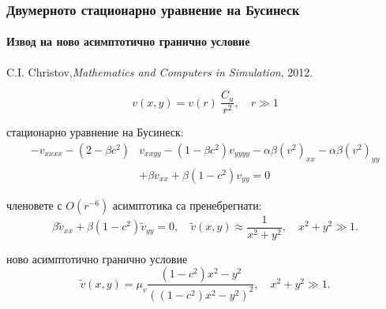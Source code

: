\documentclass{beamer}
\begin{document}

\begin{frame}
\frametitle{Двумерното стационарно уравнение на Бусинеск}
\framesubtitle{Извод на ново асимптотично гранично условие}

\begin{itemize}
 {\footnotesize \item  C.I. Christov,{\it Mathematics and Computers in Simulation}, 2012.}
\begin{equation}
v(x,y) = v(r) ~ \frac{C_u}{r^2}, \quad r\gg1
\end{equation}
\item стационарно уравнение на Бусинеск:
\begin{align}\label{outliers}
- v_{xxxx}  - (2-\beta c^2)&v_{xxyy}  - (1-\beta c^2)v_{yyyy} - \alpha \beta (v^2)_{xx} - \alpha \beta (v^2)_{yy} \nonumber \\
&+\beta v_{xx} + \beta (1-c^2) v_{yy} = 0
\end{align}
 \item членовете с $O(r^{-6})$ асимптотика са пренебрегнати:
\begin{equation}\label{asymptEq}
\beta \tilde v_{xx} + \beta (1-c^2) \tilde v_{yy} =0, \quad \tilde v(x,y) \approx \frac{1}{x^2 + y^2}, \quad x^2 + y^2 \gg 1.
\end{equation}
  \item ново асимптотично гранично условие
\begin{equation}\label{bndK}
\tilde v(x,y) = \mu_v \frac{ (1-c^2)x^2 - y^2}{ ((1-c^2)x^2 - y^2)^2}, \quad x^2 + y^2 \gg 1.
\end{equation}
\end{itemize}

\end{frame}
\end{document}
